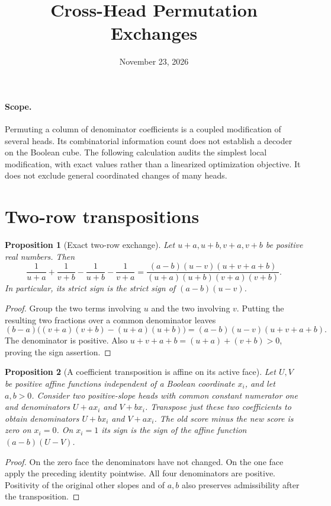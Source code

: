 \documentclass[11pt]{article}
\title{Cross-Head Permutation Exchanges}
\author{}
\date{November 23, 2026}
\newtheorem{proposition}{Proposition}
\begin{document}
\maketitle

\paragraph{Scope.}
Permuting a column of denominator coefficients is a coupled modification
of several heads. Its combinatorial information count does not establish
a decoder on the Boolean cube. The following calculation audits the
simplest local modification, with exact values rather than a linearized
optimization objective. It does not exclude general coordinated changes
of many heads.

\section{Two-row transpositions}

\begin{proposition}[Exact two-row exchange]
Let $u+a,u+b,v+a,v+b$ be positive real numbers. Then
\[
 \frac1{u+a}+\frac1{v+b}-\frac1{u+b}-\frac1{v+a}
 =\frac{(a-b)(u-v)(u+v+a+b)}
 {(u+a)(u+b)(v+a)(v+b)}.
\]
In particular, its strict sign is the strict sign of $(a-b)(u-v)$.
\end{proposition}
\begin{proof}
Group the two terms involving $u$ and the two involving $v$.
Putting the resulting two fractions over a common denominator leaves
\[
 (b-a)\big((v+a)(v+b)-(u+a)(u+b)\big)
 =(a-b)(u-v)(u+v+a+b).
\]
The denominator is positive. Also
$u+v+a+b=(u+a)+(v+b)>0$, proving the sign assertion.
\end{proof}

\begin{proposition}[A coefficient transposition is affine on its active face]
Let $U,V$ be positive affine functions independent of a Boolean coordinate
$x_i$, and let $a,b>0$. Consider two positive-slope heads with common
constant numerator one and denominators $U+a x_i$ and $V+b x_i$.
Transpose just these two coefficients to obtain denominators $U+b x_i$
and $V+a x_i$. The old score minus the new score is zero on $x_i=0$.
On $x_i=1$ its sign is the sign of the affine function
$(a-b)(U-V)$.
\end{proposition}
\begin{proof}
On the zero face the denominators have not changed. On the one face
apply the preceding identity pointwise. All four denominators are
positive. Positivity of the original other slopes and of $a,b$ also
preserves admissibility after the transposition.
\end{proof}
\end{document}
